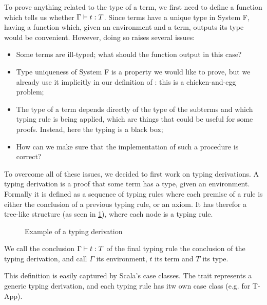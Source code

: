 To prove anything related to the type of a term, we first need to define a function which tells us whether $\Gamma \vdash{} t : {T}$. Since terms have a unique type in System F, having a function  which, given an environment and a term, outputs its type would be convenient. However, doing so raises several issues:
\begin{itemize}
    \item Some terms are ill-typed; what should the function output in this case?
    \item Type uniqueness of System F is a property we would like to prove, but we already use it implicitly in our definition of : this is a chicken-and-egg problem;
    \item The type of a term depends directly of the type of the subterms and which typing rule is being applied, which are things that could be useful for some proofs. Instead, here the typing is a black box;
    \item How can we make sure that the implementation of such a procedure is correct?
\end{itemize}
To overcome all of these issues, we decided to first work on typing derivations.
A typing derivation is a proof that some term has a type, given an environment. Formally it is defined as a sequence of typing rules where each premise of a rule is either the conclusion of a previous typing rule, or an axiom. 
It has therefor a tree-like structure (as seen in \cref{fig:td_example}), where each node is a typing rule.
\begin{figure}[H]%
    \centering
    
    \caption{Example of a typing derivation}
    \label{fig:td_example}
\end{figure}

\noindent
We call the conclusion $\Gamma \vdash{} t : {T}$ of the final typing rule the conclusion of the typing derivation, and call $\Gamma$ its environment, $t$ its term and $T$ its type.

    
This definition is easily captured by Scala's case classes. 
The trait  represents a generic typing derivation,
and each typing rule has itw own case class (e.g.  for T-App).

